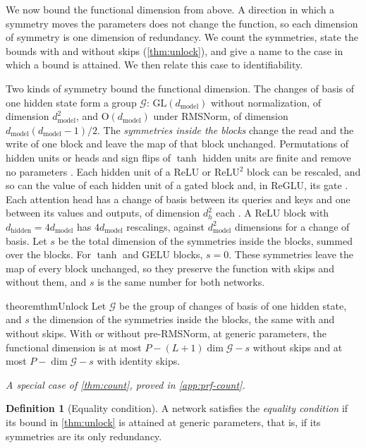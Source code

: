 \documentclass[10pt]{article}
\theoremstyle{definition}
\newtheorem{definition}[theorem]{Definition}
\theoremstyle{remark}
\newcommand{\dm}{d_{\mathrm{model}}}
\newcommand{\dhid}{d_{\mathrm{hidden}}}
\newcommand{\GL}{\mathrm{GL}}
\newcommand{\Ort}{\mathrm{O}}
\newcommand{\G}{\mathcal{G}}
\newcommand{\specialof}[2]{\par\vspace{-0.4\baselineskip}\noindent\hfill{\small\itshape A special case of \cref{#1}, proved in \cref{#2}.}\par\smallskip}
\begin{document}
We now bound the functional dimension from above. A direction in which a symmetry moves the parameters does not change the function, so each dimension of symmetry is one dimension of redundancy. We count the symmetries, state the bounds with and without skips (\cref{thm:unlock}), and give a name to the case in which a bound is attained. We then relate this case to identifiability.

Two kinds of symmetry bound the functional dimension. The changes of basis of one hidden state form a group $\G$: $\GL(\dm)$ without normalization, of dimension $\dm^2$, and $\Ort(\dm)$ under RMSNorm, of dimension $\dm(\dm-1)/2$. The \emph{symmetries inside the blocks} change the read and the write of one block and leave the map of that block unchanged. Permutations of hidden units or heads and sign flips of $\tanh$ hidden units are finite and remove no parameters \citep{hechtnielsen1989theory,sussmann1992,fefferman1994}. Each hidden unit of a ReLU or ReLU$^2$ block can be rescaled, and so can the value of each hidden unit of a gated block and, in ReGLU, its gate \citep{rolnick2020reverse,godfrey2022symmetries}. Each attention head has a change of basis between its queries and keys and one between its values and outputs, of dimension $d_h^2$ each \citep{elhage2021circuits,wang2025gauge,theus2025glmc}. A ReLU block with $\dhid = 4\dm$ has $4\dm$ rescalings, against $\dm^2$ dimensions for a change of basis. Let $s$ be the total dimension of the symmetries inside the blocks, summed over the blocks. For $\tanh$ and GELU blocks, $s = 0$. These symmetries leave the map of every block unchanged, so they preserve the function with skips and without them, and $s$ is the same number for both networks.

\begin{restatable}{theorem}{thmUnlock}\label{thm:unlock}
Let $\G$ be the group of changes of basis of one hidden state, and $s$ the dimension of the symmetries inside the blocks, the same with and without skips. With or without pre-RMSNorm, at generic parameters, the functional dimension is at most $P - (L+1)\dim\G - s$ without skips and at most $P - \dim\G - s$ with identity skips.
\end{restatable}
\specialof{thm:count}{app:prf-count}

\begin{definition}[Equality condition]\label{def:equality}
A network satisfies the \emph{equality condition} if its bound in \cref{thm:unlock} is attained at generic parameters, that is, if its symmetries are its only redundancy.
\end{definition}
\end{document}
